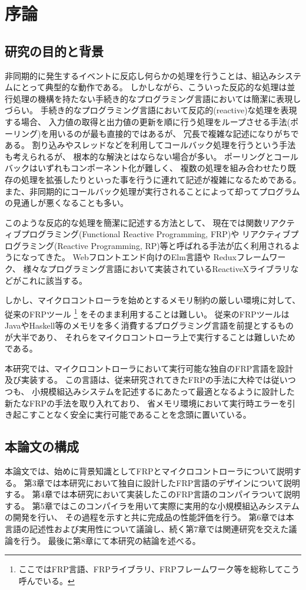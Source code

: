 \chapter{序論}
\section{研究の目的と背景}
非同期的に発生するイベントに反応し何らかの処理を行うことは、組込みシステムにとって典型的な動作である。
しかしながら、こういった反応的な処理は並行処理の機構を持たない手続き的なプログラミング言語においては簡潔に表現しづらい。
手続き的なプログラミング言語において反応的(reactive)な処理を表現する場合、
入力値の取得と出力値の更新を順に行う処理をループさせる手法(ポーリング)を用いるのが最も直接的ではあるが、
冗長で複雑な記述になりがちである。
割り込みやスレッドなどを利用してコールバック処理を行うという手法も考えられるが、
根本的な解決とはならない場合が多い。
ポーリングとコールバックはいずれもコンポーネント化が難しく、
複数の処理を組み合わせたり既存の処理を拡張したりといった事を行うに連れて記述が複雑になるためである。
また、非同期的にコールバック処理が実行されることによって却ってプログラムの見通しが悪くなることも多い。

このような反応的な処理を簡潔に記述する方法として、
現在では関数リアクティブプログラミング(Functional Reactive Programming, FRP)や
リアクティブプログラミング(Reactive Programming, RP)等と呼ばれる手法が広く利用されるようになってきた。
Webフロントエンド向けのElm言語\cite{czaplicki2012elm,czaplicki2013asynchronous}や
Reduxフレームワーク\cite{reduxwebsite}、
様々なプログラミング言語において実装されているReactiveXライブラリ\cite{rxwebsite}などがこれに該当する。

しかし、マイクロコントローラを始めとするメモリ制約の厳しい環境に対して、従来のFRPツール
\footnote{ここではFRP言語、FRPライブラリ、FRPフレームワーク等を総称してこう呼んでいる。}
をそのまま利用することは難しい。
従来のFRPツールはJavaやHaskell等のメモリを多く消費するプログラミング言語を前提とするものが大半であり、
それらをマイクロコントローラ上で実行することは難しいためである。

本研究では、マイクロコントローラにおいて実行可能な独自のFRP言語を設計及び実装する。
この言語は、従来研究されてきたFRPの手法に大枠では従いつつも、
小規模組込みシステムを記述するにあたって最適となるように設計した新たなFRPの手法を取り入れており、
省メモリ環境において実行時エラーを引き起こすことなく安全に実行可能であることを念頭に置いている。

\section{本論文の構成}
本論文では、始めに背景知識としてFRPとマイクロコントローラについて説明する。
第3章では本研究において独自に設計したFRP言語のデザインについて説明する。
第4章では本研究において実装したこのFRP言語のコンパイラついて説明する。
第5章ではこのコンパイラを用いて実際に実用的な小規模組込みシステムの開発を行い、
その過程を示すと共に完成品の性能評価を行う。
第6章では本言語の記述性および実用性について議論し、続く第7章では関連研究を交えた議論を行う。
最後に第8章にて本研究の結論を述べる。
